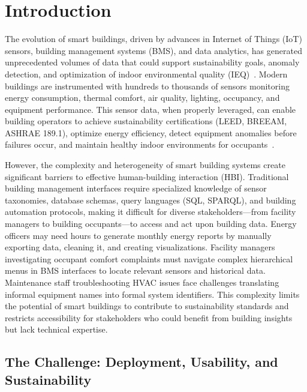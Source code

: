 \documentclass[acmlarge]{acmart}
\begin{document}
\maketitle

\section{Introduction}
The evolution of smart buildings, driven by advances in Internet of Things (IoT) sensors, building management systems (BMS), and data analytics, has generated unprecedented volumes of data that could support sustainability goals, anomaly detection, and optimization of indoor environmental quality (IEQ)~\cite{Alavi2019a,Balaji2018}. Modern buildings are instrumented with hundreds to thousands of sensors monitoring energy consumption, thermal comfort, air quality, lighting, occupancy, and equipment performance. This sensor data, when properly leveraged, can enable building operators to achieve sustainability certifications (LEED, BREEAM, ASHRAE 189.1), optimize energy efficiency, detect equipment anomalies before failures occur, and maintain healthy indoor environments for occupants~\cite{Alavi2016}.

However, the complexity and heterogeneity of smart building systems create significant barriers to effective human-building interaction (HBI). Traditional building management interfaces require specialized knowledge of sensor taxonomies, database schemas, query languages (SQL, SPARQL), and building automation protocols, making it difficult for diverse stakeholders—from facility managers to building occupants—to access and act upon building data. Energy officers may need hours to generate monthly energy reports by manually exporting data, cleaning it, and creating visualizations. Facility managers investigating occupant comfort complaints must navigate complex hierarchical menus in BMS interfaces to locate relevant sensors and historical data. Maintenance staff troubleshooting HVAC issues face challenges translating informal equipment names into formal system identifiers. This complexity limits the potential of smart buildings to contribute to sustainability standards and restricts accessibility for stakeholders who could benefit from building insights but lack technical expertise.

\subsection{The Challenge: Deployment, Usability, and Sustainability}
\end{document}
